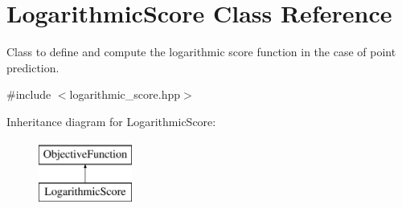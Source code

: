 \hypertarget{classLogarithmicScore}{\section{Logarithmic\-Score Class Reference}
\label{classLogarithmicScore}
}


Class to define and compute the logarithmic score function in the case of point prediction.  




{\ttfamily \#include $<$logarithmic\-\_\-score.\-hpp$>$}

Inheritance diagram for Logarithmic\-Score\-:\begin{figure}[H]
\begin{center}
\leavevmode
\includegraphics[height=2.000000cm]{classLogarithmicScore}
\end{center}
\end{figure}
